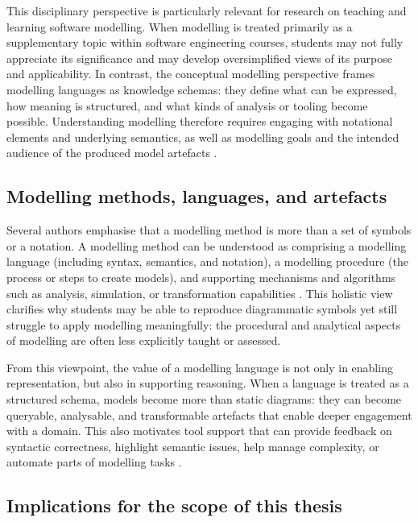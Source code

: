 This disciplinary perspective is particularly relevant for research on teaching and learning software modelling. When modelling is treated primarily as a supplementary topic within software engineering courses, students may not fully appreciate its significance and may develop oversimplified views of its purpose and applicability. In contrast, the conceptual modelling perspective frames modelling languages as knowledge schemas: they define what can be expressed, how meaning is structured, and what kinds of analysis or tooling become possible. Understanding modelling therefore requires engaging with notational elements and underlying semantics, as well as modelling goals and the intended audience of the produced model artefacts \cite{buchmann2019conceptual}.

\subsection{Modelling methods, languages, and artefacts}
\label{subsec:modelling_methods_languages_artefacts}

Several authors emphasise that a modelling method is more than a set of symbols or a notation. A modelling method can be understood as comprising a modelling language (including syntax, semantics, and notation), a modelling procedure (the process or steps to create models), and supporting mechanisms and algorithms such as analysis, simulation, or transformation capabilities \cite{bork2019framework,buchmann2019conceptual}. This holistic view clarifies why students may be able to reproduce diagrammatic symbols yet still struggle to apply modelling meaningfully: the procedural and analytical aspects of modelling are often less explicitly taught or assessed.

From this viewpoint, the value of a modelling language is not only in enabling representation, but also in supporting reasoning. When a language is treated as a structured schema, models become more than static diagrams: they can become queryable, analysable, and transformable artefacts that enable deeper engagement with a domain. This also motivates tool support that can provide feedback on syntactic correctness, highlight semantic issues, help manage complexity, or automate parts of modelling tasks \cite{bogdanova2019camelot,maslov2025conceptual}.

\subsection{Implications for the scope of this thesis}
\label{subsec:implications_scope_thesis}

